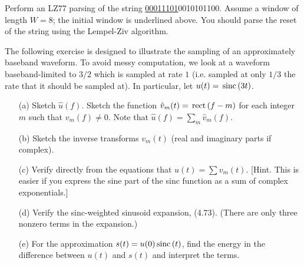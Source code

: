 \documentclass{assignment}
\begin{document}
\begin{prob}[2.33]
    Perform an LZ77 parsing of the string \uline{00011101}0010101100. Assume a window of length $W=8$; the initial window is underlined above. You should parse the reset of the string using the Lempel-Ziv algorithm.
\end{prob}
\begin{sol}
\end{sol}

\begin{prob}[4.35 Aliasing]
    The following exercise is designed to illustrate the sampling of an approximately baseband waveform. To avoid messy computation, we look at a waveform baseband-limited to $3/2$ which is sampled at rate $1$ (i.e. sampled at only $1/3$ the rate that it should be sampled at). In particular, let $u(t)=\,\text{sinc}\,(3t)$.
    \begin{itemize}
        \item[(a)] Sketch $\hat{u}(f)$. Sketch the function $\hat{v}_m(t)=\,\text{rect}\,(f-m)$ for each integer $m$ such that $v_m(f)\neq 0$. Note that $\hat{u}(f)=\sum_m\hat{v}_m(f)$.
        \item[(b)] Sketch the inverse transforms $v_m(t)$ (real and imaginary parts if complex).
        \item[(c)] Verify directly from the equations that $u(t)=\sum v_m(t)$. [Hint. This is easier if you express the sine part of the sinc function as a sum of complex exponentials.]
        \item[(d)] Verify the sinc-weighted sinusoid expansion, (4.73). (There are only three nonzero terms in the expansion.)
        \item[(e)] For the approximation $s(t)=u(0)\,\text{sinc}\,(t)$, find the energy in the difference between $u(t)$ and $s(t)$ and interpret the terms.
    \end{itemize}
\end{prob}
\begin{sol}
\end{sol}
\end{document}
